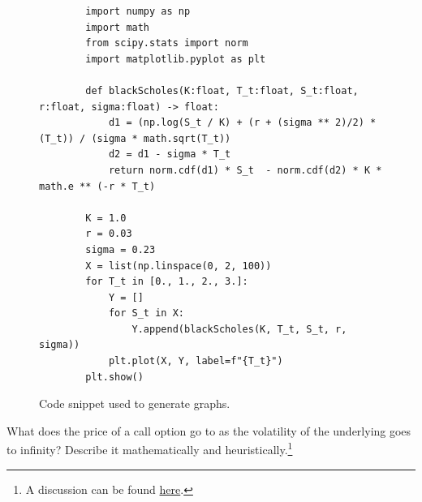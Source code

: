 \documentclass{article}
\begin{document}
    \begin{figure}[H]
      \centering 
      \begin{lstlisting}
        import numpy as np 
        import math
        from scipy.stats import norm
        import matplotlib.pyplot as plt 

        def blackScholes(K:float, T_t:float, S_t:float, r:float, sigma:float) -> float: 
            d1 = (np.log(S_t / K) + (r + (sigma ** 2)/2) * (T_t)) / (sigma * math.sqrt(T_t))  
            d2 = d1 - sigma * T_t 
            return norm.cdf(d1) * S_t  - norm.cdf(d2) * K * math.e ** (-r * T_t)

        K = 1.0 
        r = 0.03
        sigma = 0.23
        X = list(np.linspace(0, 2, 100))
        for T_t in [0., 1., 2., 3.]: 
            Y = []
            for S_t in X: 
                Y.append(blackScholes(K, T_t, S_t, r, sigma))
            plt.plot(X, Y, label=f"{T_t}")
        plt.show() 
      \end{lstlisting}
      \caption{Code snippet used to generate graphs.} 
      \label{fig:black_scholes_graph_code}
    \end{figure}

    \begin{exercise}
      What does the price of a call option go to as the volatility of the underlying goes to infinity? Describe it mathematically and heuristically.\footnote{A discussion can be found \href{https://quant.stackexchange.com/questions/39490/value-of-call-option-as-volatility-goes-to-infinity}{here}. } 
    \end{exercise}
\end{document}
